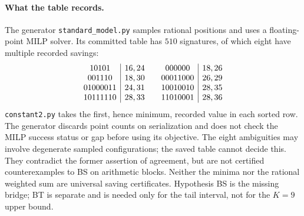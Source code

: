 \paragraph{What the table records.}
The generator \texttt{standard\_model.py} samples rational positions and uses a floating-point MILP solver.
Its committed table has $510$ signatures, of which eight have multiple recorded savings:
\[
\begin{array}{c|l@{\qquad}c|l}
10101&16,24&000000&18,26\\
001110&18,30&00011000&26,29\\
01000011&24,31&10010010&28,35\\
10111110&28,33&11010001&28,36
\end{array}
\]
\texttt{constant2.py} takes the first, hence minimum, recorded value in each sorted row.
The generator discards point counts on serialization and does not check the MILP success status or gap before using its objective.
The eight ambiguities may involve degenerate sampled configurations; the saved table cannot decide this.
They contradict the former assertion of agreement, but are not certified counterexamples to BS on arithmetic blocks.
Neither the minima nor the rational weighted sum are universal saving certificates.  Hypothesis BS is the missing bridge;
BT is separate and is needed only for the tail interval, not for the $K=9$ upper bound.

